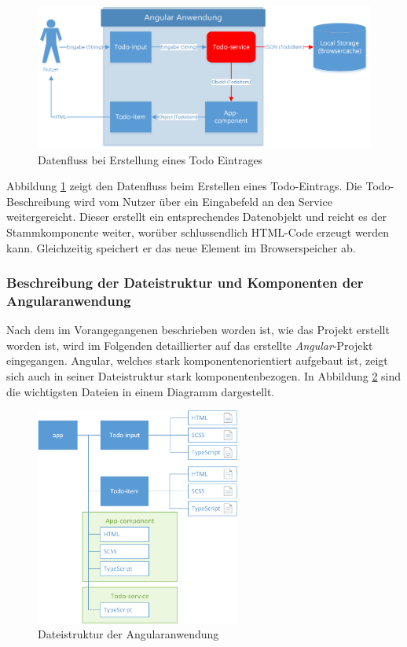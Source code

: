\begin{figure}[h!]
	\includegraphics[width=\textwidth]{img/pwa_datenfluss_erstellen.png}
	\centering
	\caption{Datenfluss bei Erstellung eines Todo Eintrages}
	\label{fig:pwa_datenfluss_erstellen}
\end{figure}

Abbildung \ref{fig:pwa_datenfluss_erstellen} zeigt den Datenfluss beim Erstellen eines Todo-Eintrags. Die Todo-Beschreibung wird vom Nutzer über ein Eingabefeld an den Service weitergereicht. Dieser erstellt ein entsprechendes Datenobjekt und reicht es der Stammkomponente weiter, worüber schlussendlich HTML-Code erzeugt werden kann. Gleichzeitig speichert er das neue Element im Browserspeicher ab.

\subsubsection{Beschreibung der Dateistruktur und Komponenten der Angularanwendung}
Nach dem im Vorangegangenen beschrieben worden ist, wie das Projekt erstellt worden ist, wird im Folgenden detaillierter auf das erstellte \textit{Angular}-Projekt eingegangen. Angular, welches stark komponentenorientiert aufgebaut ist, zeigt sich auch in seiner Dateistruktur stark komponentenbezogen. In Abbildung \ref{fig:pwa_dateistruktur} sind die wichtigsten Dateien in einem Diagramm dargestellt.

\begin{figure}[h!]
	\includegraphics[width=0.6\textwidth]{img/pwa_dateistruktur.png}
	\centering
	\caption{Dateistruktur der Angularanwendung}
	\label{fig:pwa_dateistruktur}
\end{figure}

